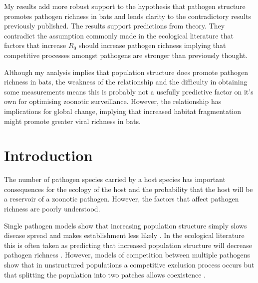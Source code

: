 My results add more robust support to the hypothesis that pathogen structure promotes pathogen richness in bats and lends clarity to the contradictory results previously published.
The results support predictions from theory.
They contradict the assumption commonly made in the ecological literature that factors that increase $R_0$ should increase pathogen richness implying that competitive processes amongst pathogens are stronger than previously thought.



Although my analysis implies that population structure does promote pathogen richness in bats, the weakness of the relationship and the difficulty in obtaining some measurements means this is probably not a usefully predictive factor on it's own for optimising zoonotic surveillance.
However, the relationship has implications for global change, implying that increased habitat fragmentation might promote greater viral richness in bats.






\section{Introduction}


The number of pathogen species carried by a host species has important consequences for the ecology of the host and the probability that the host will be a reservoir of a zoonotic pathogen.
However, the factors that affect pathogen richness are poorly understood.







Single pathogen models show that increasing population structure simply slows disease spread and makes establishment less likely \cite{colizza2007invasion, vespignani2008reaction}.
In the ecological literature this is often taken as predicting that increased population structure will decrease pathogen richness \cite{nunn2003comparative, morand2000wormy}.
However, models of competition between multiple pathogens show that in unstructured populations a competitive exclusion process occurs but that splitting the population into two patches allows coexistence \cite{qiu2013vector,allen2004sis, nunes2006localized}.


